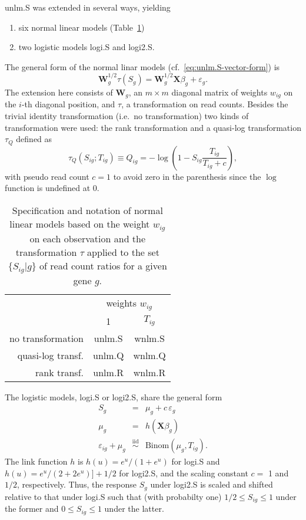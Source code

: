 \documentclass[letterpaper]{article}
\begin{document}
unlm.S was extended in several ways, yielding
\begin{enumerate}
\item six normal linear models (Table~\ref{tab:nlm})
\item two logistic models logi.S and logi2.S.
\end{enumerate}

The general form of the normal linar models
(cf.~\ref{eq:unlm.S-vector-form}) is
\begin{equation}
\mathbf{W}_g^{1/2} \tau(S_g) = \mathbf{W}_g^{1/2} \mathbf{X} \beta_g + \varepsilon_g.
\label{eq:nlm-general}
\end{equation}
The extension here consists of \(\mathbf{W}_g\), an \(m\times m\) diagonal matrix of
weights \(w_{ig}\) on the \(i\)-th diagonal position, and \(\tau\), a
transformation on read counts.  Besides the trivial identity transformation
(i.e.~no transformation) two kinds of transformation were used: the rank
transformation and a quasi-log transformation \(\tau_Q\) defined as
\begin{equation}
\tau_Q(S_{ig};T_{ig}) \equiv Q_{ig} = - \log \left( 1 - S_{ig} \frac{T_{ig}}{T_{ig} + c}
\right),
\label{eq:Q}
\end{equation}
with pseudo read count \(c=1\) to avoid zero in the parenthesis since the \(\log\)
function is undefined at \(0\).

\begin{table}
\begin{center}
\begin{tabular}{r|cc}
 & \multicolumn{2}{c}{weights \(w_{ig}\)} \\
 & 1 & \(T_{ig}\) \\
\hline
no transformation & unlm.S & wnlm.S \\
quasi-log transf. & unlm.Q & wnlm.Q \\
rank transf. & unlm.R & wnlm.R \\
\end{tabular}
\end{center}
\caption{Specification and notation of normal linear models based on the weight
\(w_{ig}\) on each observation and the
transformation \(\tau\) applied to the set \(\{S_{ig} | g\}\) of read count
ratios for a given gene \(g\).}
\label{tab:nlm}
\end{table}

The logistic models, logi.S or logi2.S, share the general form
\begin{eqnarray}
S_g &=& \mu_g + c\, \varepsilon_g
\label{eq:logi-general}
\\
\mu_g &=& h(\mathbf{X} \beta_g)
\label{eq:glm-mean-predictor}
\\
\varepsilon_{ig} + \mu_g &\overset{\mathrm{iid}}{\sim}& \mathrm{Binom}(\mu_g, T_{ig}).
\label{eq:binom-error}
\end{eqnarray}
The link function \(h\) is \(h(u) = e^u / (1 + e^u)\) for logi.S and \(h(u) =
e^u / (2 + 2e^u)] + 1/2\) for logi2.S, and the scaling constant \(c=\) 1
 and \(1/2\), respectively.  Thus, the response \(S_g\) under logi2.S is scaled and shifted relative to
that under logi.S such that (with probabilty one) \(1/2\le S_{ig}\le 1\) under the former and
\(0\le S_{ig}\le 1\) under the latter.
\end{document}
